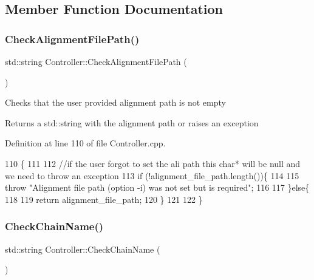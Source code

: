 \subsection{Member Function Documentation}
\mbox{\label{classController_a79fd3abba4177d597d571a97032c6432}} 
\subsubsection{\texorpdfstring{Check\+Alignment\+File\+Path()}{CheckAlignmentFilePath()}}
{\footnotesize\ttfamily std\+::string Controller\+::\+Check\+Alignment\+File\+Path (\begin{DoxyParamCaption}{ }\end{DoxyParamCaption})}

Checks that the user provided alignment path is not empty \begin{DoxyReturn}{Returns}
a std\+::string with the alignment path or raises an exception 
\end{DoxyReturn}


Definition at line 110 of file Controller.\+cpp.


\begin{DoxyCode}
110                                              \{
111   
112   \textcolor{comment}{//if the user forgot to set the ali path this char* will be null and we need to throw an exception}
113   \textcolor{keywordflow}{if} (!alignment\_file\_path.length())\{
114     
115     \textcolor{keywordflow}{throw} \textcolor{stringliteral}{"Alignment file path (option -i) was not set but is required"};
116     
117   \}\textcolor{keywordflow}{else}\{
118   
119     \textcolor{keywordflow}{return} alignment\_file\_path;
120   \}
121   
122 \}
\end{DoxyCode}
\mbox{\label{classController_a207236dbade67acf265531bfa7769056}} 
\subsubsection{\texorpdfstring{Check\+Chain\+Name()}{CheckChainName()}}
{\footnotesize\ttfamily std\+::string Controller\+::\+Check\+Chain\+Name (\begin{DoxyParamCaption}{ }\end{DoxyParamCaption})}

